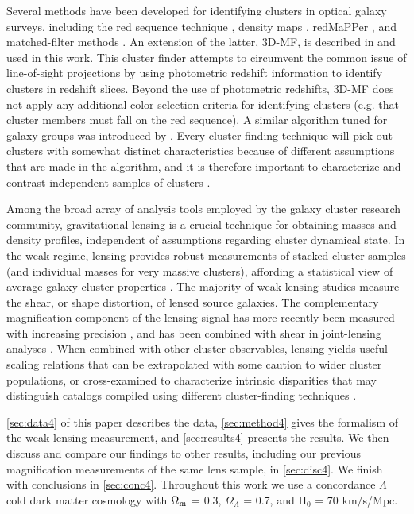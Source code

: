 Several methods have been developed for identifying clusters in optical galaxy surveys, including the red sequence technique \citep{Gladders00}, density maps \citep{Adami10}, redMaPPer \citep{Rykoff14}, and matched-filter methods \citep{Postman96}. An extension of the latter, \ac{3D-MF}, is described in \citet{Milkeraitis10} and used in this work. This cluster finder attempts to circumvent the common issue of line-of-sight projections by using photometric redshift information to identify clusters in redshift slices. Beyond the use of photometric redshifts, \ac{3D-MF} does not apply any additional color-selection criteria for identifying clusters (e.g. that cluster members must fall on the red sequence). A similar algorithm tuned for galaxy groups was introduced by \citet{Gillis11}. Every cluster-finding technique will pick out clusters with somewhat distinct characteristics because of different assumptions that are made in the algorithm, and it is therefore important to characterize and contrast independent samples of clusters \citep{Milkeraitis10}.

Among the broad array of analysis tools employed by the galaxy cluster research community, gravitational lensing is a crucial technique for obtaining masses and density profiles, independent of assumptions regarding cluster dynamical state. In the weak regime, lensing provides robust measurements of stacked cluster samples (and individual masses for very massive clusters), affording a statistical view of average galaxy cluster properties \citep{Hoekstra13}. The majority of weak lensing studies measure the shear, or shape distortion, of lensed source galaxies. The complementary magnification component of the lensing signal has more recently been measured with increasing precision \citep{Scranton05,Hildebrandt09b,Ford12,Ford14,Morrison12,Hildebrandt13,Bauer14}, and has been combined with shear in joint-lensing analyses \citep{Umetsu11,Umetsu14}. When combined with other cluster observables, lensing yields useful scaling relations that can be extrapolated with some caution to wider cluster populations, or cross-examined to characterize intrinsic disparities that may distinguish catalogs compiled using different cluster-finding techniques \citep{Hoekstra07,Johnston07,Leauthaud10,Hoekstra12,Covone14,Oguri14}.

\autoref{sec:data4} of this paper describes the data, \autoref{sec:method4} gives the formalism of the weak lensing measurement, and \autoref{sec:results4} presents the results. We then discuss and compare our findings to other results, including our previous magnification measurements of the same lens sample, in \autoref{sec:disc4}. We finish with conclusions in \autoref{sec:conc4}. Throughout this work we use a concordance $\Lambda$ cold dark matter cosmology with $\Omega_{\rm m}$ = 0.3, $\Omega_{\Lambda}$ = 0.7, and H$_0$ = 70 km/s/Mpc.

